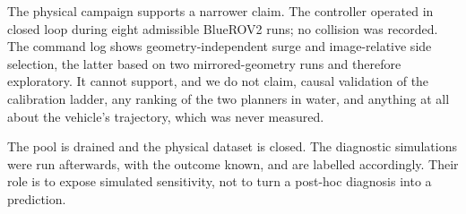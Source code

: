 The physical campaign supports a narrower claim. The controller operated
in closed loop during eight admissible BlueROV2 runs; no collision was recorded.
The command log shows geometry-independent surge and image-relative side
selection, the latter based on two mirrored-geometry runs and therefore
exploratory. It cannot support, and we do not claim, causal validation of the
calibration ladder, any ranking of the two planners in water, and
anything at all about the vehicle's trajectory, which was never
measured.

The pool is drained and the physical dataset is closed. The diagnostic
simulations were run afterwards, with the outcome known, and are labelled
accordingly. Their role is to expose simulated sensitivity, not to turn a
post-hoc diagnosis into a prediction.
